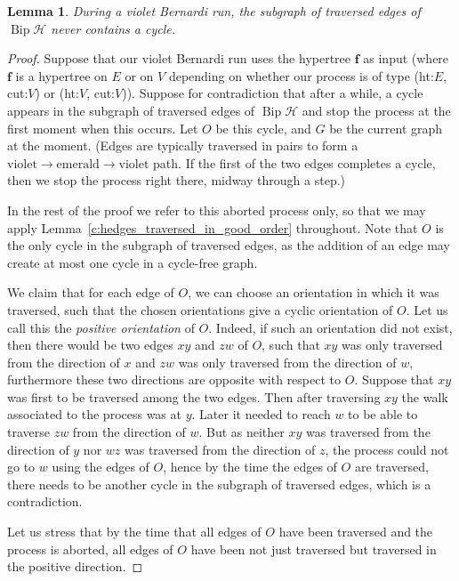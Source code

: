 \documentclass[10pt]{amsart}
\newtheorem{lemma}[theo]{Lemma}
\theoremstyle{definition}\newtheorem{defi}[theo]{Definition}
\theoremstyle{remark}\newtheorem{rema}[theo]{Remark}
\newcommand{\HH}{\mathcal H}
\DeclareMathOperator{\bip}{Bip}
\begin{document}
\begin{lemma} 
\label{l:no_cycl_in_Bernardi}
During a violet Bernardi run, the subgraph of traversed edges of $\bip \HH$ never contains a cycle.
\end{lemma}

\begin{proof}
Suppose that our violet Bernardi run uses the hypertree $\mathbf f$ as input (where $\mathbf f$ is a hypertree on $E$ or on $V$ depending on whether our process is of type (ht:$E$, cut:$V$) or (ht:$V$, cut:$V$)). Suppose for contradiction that after a while, a cycle appears in the subgraph of traversed edges of $\bip \HH$ and stop the process at the first moment when this occurs. Let $O$ be this cycle, and $G$ be the current graph at the moment. (Edges are typically traversed in pairs to form a $\text{violet}\to\text{emerald}\to\text{violet}$ path. If the first of the two edges completes a cycle, then we stop the process right there, midway through a step.)

In the rest of the proof we refer to this aborted process only, so that we may apply Lemma~\ref{c:hedges_traversed_in_good_order} throughout. Note that $O$ is the only cycle in the subgraph of traversed edges, as the addition of an edge may create at most one cycle in a cycle-free graph.

We claim that for each edge of $O$, we can choose an orientation in which it was traversed, such that the chosen orientations give a cyclic orientation of $O$. Let us call this the \emph{positive orientation} of $O$. Indeed, if such an orientation did not exist, then there would be two edges $xy$ and $zw$ of $O$, such that $xy$ was only traversed from the direction of $x$ and $zw$ was only traversed from the direction of $w$, furthermore these two directions are opposite with respect to $O$. Suppose that $xy$ was first to be traversed among the two edges. Then after traversing $xy$ the walk associated to the process was at $y$. Later it needed to reach $w$ to be able to traverse $zw$ from the direction of $w$. But as neither $xy$ was traversed from the direction of $y$ nor $wz$ was traversed from the direction of $z$, the process could not go to $w$ using the edges of $O$, hence by the time the edges of $O$ are traversed, there needs to be another cycle in the subgraph of traversed edges, which is a contradiction.

Let us stress that by the time that all edges of $O$ have been traversed and the process is aborted, all edges of $O$ have been not just traversed but traversed in the positive direction.


\end{proof}
\end{document}

